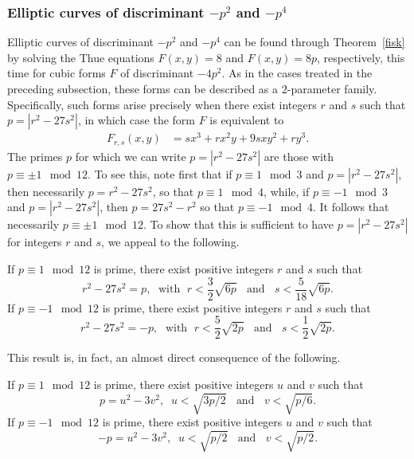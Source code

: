 \subsubsection{Elliptic curves of discriminant $-p^2$ and $-p^4$} \label{pinky2}
Elliptic curves of discriminant $-p^2$ and $-p^4$ can be found through Theorem~\ref{fisk} by solving 
the Thue equations $F(x,y)=8$ and $F(x,y)=8p$, respectively, this time  for cubic forms $F$ of 
discriminant $-4p^2$. As in the cases treated in the preceding subsection, these forms can be described as a $2$-parameter family.
Specifically, such forms arise precisely when there exist integers $r$ and $s$ such that
$p = | r^2 - 27 s^2|$, in which case the form $F$ is equivalent to 
 \begin{align*}
F_{r,s}(x,y)&=sx^3+r x^2y + 9s x y^2 + r y^3.
\end{align*}
The primes $p$ for which we can write  $p = | r^2 - 27 s^2|$ are those  with $p \equiv \pm 1 \mod{12}$.
To see this, note first that if $p \equiv 1 \mod{3}$ and $p = | r^2 - 27 s^2|$, then necessarily $p=r^2-27s^2$, so that $p \equiv 1 \mod{4}$, while, if $p \equiv -1 \mod{3}$ and
 $p = | r^2 - 27 s^2|$, then $p=27s^2-r^2$ so that $p \equiv -1 \mod{4}$. It follows that necessarily $p \equiv \pm 1 \mod{12}$. To show that this is sufficient to have $p =|r^2-27s^2|$ for integers $r$ and $s$, we appeal
 to the following.
\begin{proposition} \label{neg-pee2}
If $p \equiv 1 \mod{12}$ is prime, there exist positive integers $r$ and $s$ such that
$$
r^2-27 s^2 = p, \; \mbox{ with } \; r < \frac{3}{2} \sqrt{6p} \; \; \mbox{ and } \; \;  s < \frac{5}{18} \sqrt{6p}.
$$
If $p \equiv -1 \mod{12}$ is prime, there exist positive integers $r$ and $s$ such that
$$
r^2-27 s^2 = -p,  \; \mbox{ with } \; r < \frac{5}{2} \sqrt{2p}  \; \; \mbox{ and } \; \; s < \frac{1}{2} \sqrt{2p}.
$$
\end{proposition}
This result is, in fact, an almost  direct consequence of the following.
\begin{theorem}\label{Nag}
If $p \equiv 1 \mod{12}$ is prime, there exist positive integers $u$ and $v$ such that
$$
p = u^2-3 v^2, \; \; u  < \sqrt{3p/2}  \; \; \mbox{ and } \; \; v < \sqrt{p/6}.
$$
If $p \equiv -1 \mod{12}$ is prime, there exist positive integers $u$ and $v$ such that
$$
-p = u^2-3v^2, \; \; u < \sqrt{p/2} \; \; \mbox{ and } \; \;  v < \sqrt{p/2}.
$$
\end{theorem}
